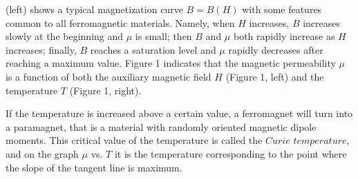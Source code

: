 \documentclass[12pt]{article}
\begin{document}
(left) shows a typical magnetization curve $B = B(H)$ with some features common to all
ferromagnetic materials. Namely, when $H$ increases, $B$ increases slowly at the beginning
and $\mu$ is small; then $B$ and $\mu$ both rapidly increase as $H$ increases; finally, $B$ reaches a saturation level and $\mu$ rapidly decreases after reaching a maximum value. Figure 1 indicates that the magnetic permeability $\mu$ is a function of both the auxiliary magnetic field $H$ (Figure 1, left) and the temperature $T$ (Figure 1, right).
\par If the temperature is increased above a certain value, a ferromagnet will turn into a paramagnet, that is a material with randomly oriented magnetic dipole moments. This critical value of the temperature is called the $Curie$ $temperature$, and on the graph $\mu$ vs.
$T$ it is the temperature corresponding to the point where the slope of the tangent line is
maximum.
\end{document}
